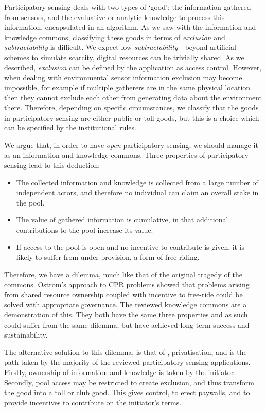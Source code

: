 Participatory sensing deals with two types of `good': the information gathered
from sensors, and the evaluative or analytic knowledge to process this
information, encapsulated in an algorithm. As we saw with the information and
knowledge commons, classifying these goods in terms of \emph{exclusion} and
\emph{subtractability} is difficult. We expect low
\emph{subtractability}---beyond artificial schemes to simulate scarcity,
digital resources can be trivially shared. As we described, \emph{exclusion}
can be defined by the application as access control. However, when dealing
with environmental sensor information exclusion may become impossible, for
example if multiple gatherers are in the same physical location then they
cannot exclude each other from generating data about the environment there.
Therefore, depending on specific circumstances, we classify that the goods in
participatory sensing are either public or toll goods, but this is a choice
which can be specified by the institutional rules. %

We argue that, in order to have \emph{open} participatory sensing, we should manage it as an information and knowledge commons. Three properties of participatory sensing lead to this deduction:

\begin{itemize}
\item The collected information and knowledge is collected from a large number of independent actors, and therefore no individual can claim an overall stake in the pool.
\item The value of gathered information is cumulative, in that additional contributions to the pool increase its value.
\item If access to the pool is open and no incentive to contribute is given, it is likely to suffer from under-provision, a form of free-riding. 
\end{itemize}

Therefore, we have a dilemma, much like that of the original tragedy of the
commons. Ostrom's approach to \ac{CPR} problems showed that problems arising
from shared resource ownership coupled with incentive to free-ride could be
solved with appropriate governance. The reviewed knowledge commons are a
demonstration of this. They both have the same three properties and as such
could suffer from the same dilemma, but have achieved long term success and
sustainability.

The alternative solution to this dilemma, is that of \citet{Hardin1968},
privatisation, and is the path taken by the majority of the reviewed
participatory-sensing applications. Firstly, ownership of information and
knowledge is taken by the initiator. Secondly, pool access may be restricted
to create exclusion, and thus transform the good into a toll or club good.
This gives control, to erect paywalls, and to provide incentives to contribute
on the initiator's terms.

